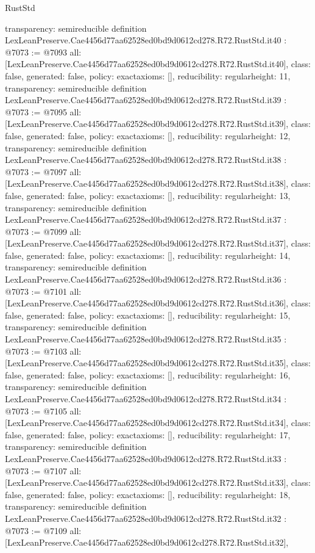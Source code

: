 \begin{lexlean}{RustStd}
\begin{coremodule}
{  transparency: semireducible
}
definition LexLeanPreserve.Cae4456d77aa62528ed0bd9d0612cd278.R72.RustStd.it40 : @7073 := @7093 {
  all: [LexLeanPreserve.Cae4456d77aa62528ed0bd9d0612cd278.R72.RustStd.it40],
  class: false,
  generated: false,
  policy: exact{axioms: []},
  reducibility: regular{height: 11},
  transparency: semireducible
}
definition LexLeanPreserve.Cae4456d77aa62528ed0bd9d0612cd278.R72.RustStd.it39 : @7073 := @7095 {
  all: [LexLeanPreserve.Cae4456d77aa62528ed0bd9d0612cd278.R72.RustStd.it39],
  class: false,
  generated: false,
  policy: exact{axioms: []},
  reducibility: regular{height: 12},
  transparency: semireducible
}
definition LexLeanPreserve.Cae4456d77aa62528ed0bd9d0612cd278.R72.RustStd.it38 : @7073 := @7097 {
  all: [LexLeanPreserve.Cae4456d77aa62528ed0bd9d0612cd278.R72.RustStd.it38],
  class: false,
  generated: false,
  policy: exact{axioms: []},
  reducibility: regular{height: 13},
  transparency: semireducible
}
definition LexLeanPreserve.Cae4456d77aa62528ed0bd9d0612cd278.R72.RustStd.it37 : @7073 := @7099 {
  all: [LexLeanPreserve.Cae4456d77aa62528ed0bd9d0612cd278.R72.RustStd.it37],
  class: false,
  generated: false,
  policy: exact{axioms: []},
  reducibility: regular{height: 14},
  transparency: semireducible
}
definition LexLeanPreserve.Cae4456d77aa62528ed0bd9d0612cd278.R72.RustStd.it36 : @7073 := @7101 {
  all: [LexLeanPreserve.Cae4456d77aa62528ed0bd9d0612cd278.R72.RustStd.it36],
  class: false,
  generated: false,
  policy: exact{axioms: []},
  reducibility: regular{height: 15},
  transparency: semireducible
}
definition LexLeanPreserve.Cae4456d77aa62528ed0bd9d0612cd278.R72.RustStd.it35 : @7073 := @7103 {
  all: [LexLeanPreserve.Cae4456d77aa62528ed0bd9d0612cd278.R72.RustStd.it35],
  class: false,
  generated: false,
  policy: exact{axioms: []},
  reducibility: regular{height: 16},
  transparency: semireducible
}
definition LexLeanPreserve.Cae4456d77aa62528ed0bd9d0612cd278.R72.RustStd.it34 : @7073 := @7105 {
  all: [LexLeanPreserve.Cae4456d77aa62528ed0bd9d0612cd278.R72.RustStd.it34],
  class: false,
  generated: false,
  policy: exact{axioms: []},
  reducibility: regular{height: 17},
  transparency: semireducible
}
definition LexLeanPreserve.Cae4456d77aa62528ed0bd9d0612cd278.R72.RustStd.it33 : @7073 := @7107 {
  all: [LexLeanPreserve.Cae4456d77aa62528ed0bd9d0612cd278.R72.RustStd.it33],
  class: false,
  generated: false,
  policy: exact{axioms: []},
  reducibility: regular{height: 18},
  transparency: semireducible
}
definition LexLeanPreserve.Cae4456d77aa62528ed0bd9d0612cd278.R72.RustStd.it32 : @7073 := @7109 {
  all: [LexLeanPreserve.Cae4456d77aa62528ed0bd9d0612cd278.R72.RustStd.it32],
}
\end{coremodule}
\end{lexlean}
